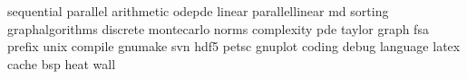 sequential
parallel
arithmetic
odepde
linear
parallellinear
md
sorting
graphalgorithms
discrete
montecarlo
norms
complexity
pde
taylor
graph
fsa
prefix
unix
compile
gnumake
svn
hdf5
petsc
gnuplot
coding
debug
language
latex
cache
bsp
heat
wall
